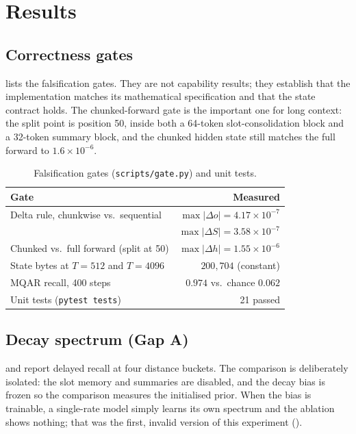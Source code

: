 \section{Results}
\label{sec:results}

\subsection{Correctness gates}

 lists the falsification gates. They are not capability results; they establish
that the implementation matches its mathematical specification and that the state contract
holds. The chunked-forward gate is the important one for long context: the split point is
position 50, inside both a 64-token slot-consolidation block and a 32-token summary block, and
the chunked hidden state still matches the full forward to $1.6\times10^{-6}$.

\begin{table}[t]
\centering
\caption{Falsification gates (\texttt{scripts/gate.py}) and unit tests.}
\label{tab:gates}
\small
\begin{tabularx}{\columnwidth}{@{}>{\raggedright\arraybackslash}X r@{}}
\toprule
Gate & Measured \\
\midrule
Delta rule, chunkwise vs.\ sequential & $\max|\Delta o|=4.17\times10^{-7}$ \\
 & $\max|\Delta S|=3.58\times10^{-7}$ \\
Chunked vs.\ full forward (split at 50) & $\max|\Delta h|=1.55\times10^{-6}$ \\
State bytes at $T=512$ and $T=4096$ & $200{,}704$ (constant) \\
MQAR recall, 400 steps & $0.974$ vs.\ chance $0.062$ \\
Unit tests (\texttt{pytest tests}) & 21 passed \\
\bottomrule
\end{tabularx}
\end{table}

\subsection{Decay spectrum (Gap A)}
\label{sec:results-gap-a}

 and  report delayed recall at four distance buckets. The
comparison is deliberately isolated: the slot memory and summaries are disabled, and the decay
bias is frozen so the comparison measures the initialised prior. When the bias is trainable, a
single-rate model simply learns its own spectrum and the ablation shows nothing; that was the
first, invalid version of this experiment ().

